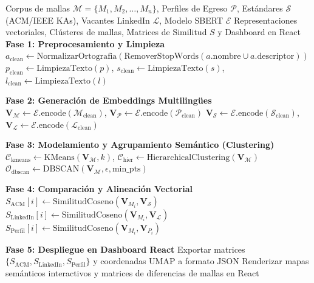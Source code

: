 \begin{algorithm}[H]
	\caption{Pipeline Computacional de Análisis Semántico y Comparación de Mallas Curriculares}
	\label{alg:pipeline_mallas_doc}
	\small
	\begin{algorithmic}[1]
		\Require Corpus de mallas $\mathcal{M} = \{M_1, M_2, \dots, M_n\}$, Perfiles de Egreso $\mathcal{P}$, Estándares $\mathcal{S}$ (ACM/IEEE KAs), Vacantes LinkedIn $\mathcal{L}$, Modelo SBERT $\mathcal{E}$
		\Ensure Representaciones vectoriales, Clústeres de mallas, Matrices de Similitud $S$ y Dashboard en React
		\Statex
			\State \textbf{Fase 1: Preprocesamiento y Limpieza}
				\State $a_{\text{clean}} \leftarrow \text{NormalizarOrtografia}(\text{RemoverStopWords}(a.\text{nombre} \cup a.\text{descriptor}))$
			\EndFor
				\State $p_{\text{clean}} \leftarrow \text{LimpiezaTexto}(p)$, \quad $s_{\text{clean}} \leftarrow \text{LimpiezaTexto}(s)$, \quad $l_{\text{clean}} \leftarrow \text{LimpiezaTexto}(l)$
			\EndFor
			
			\Statex
			\State \textbf{Fase 2: Generación de Embeddings Multilingües}
			\State $\mathbf{V}_{\mathcal{M}} \leftarrow \mathcal{E}.\text{encode}(\mathcal{M}_{\text{clean}})$, \quad $\mathbf{V}_{\mathcal{P}} \leftarrow \mathcal{E}.\text{encode}(\mathcal{P}_{\text{clean}})$
			\State $\mathbf{V}_{\mathcal{S}} \leftarrow \mathcal{E}.\text{encode}(\mathcal{S}_{\text{clean}})$, \quad $\mathbf{V}_{\mathcal{L}} \leftarrow \mathcal{E}.\text{encode}(\mathcal{L}_{\text{clean}})$
			
			\Statex
			\State \textbf{Fase 3: Modelamiento y Agrupamiento Semántico (Clustering)}
			\State $\mathcal{C}_{\text{kmeans}} \leftarrow \text{KMeans}(\mathbf{V}_{\mathcal{M}}, k)$, \quad $\mathcal{C}_{\text{hier}} \leftarrow \text{HierarchicalClustering}(\mathbf{V}_{\mathcal{M}})$
			\State $\mathcal{O}_{\text{dbscan}} \leftarrow \text{DBSCAN}(\mathbf{V}_{\mathcal{M}}, \epsilon, \text{min\_pts})$ 
			
			\Statex
			\State \textbf{Fase 4: Comparación y Alineación Vectorial}
				\State $S_{\text{ACM}}[i] \leftarrow \text{SimilitudCoseno}(\mathbf{V}_{M_i}, \mathbf{V}_{\mathcal{S}})$ 
				\State $S_{\text{LinkedIn}}[i] \leftarrow \text{SimilitudCoseno}(\mathbf{V}_{M_i}, \mathbf{V}_{\mathcal{L}})$ 
				\State $S_{\text{Perfil}}[i] \leftarrow \text{SimilitudCoseno}(\mathbf{V}_{M_i}, \mathbf{V}_{P_i})$ 
			\EndFor
			
			\Statex
			\State \textbf{Fase 5: Despliegue en Dashboard React}
			\State Exportar matrices $\{S_{\text{ACM}}, S_{\text{LinkedIn}}, S_{\text{Perfil}}\}$ y coordenadas UMAP a formato JSON
			\State Renderizar mapas semánticos interactivos y matrices de diferencias de mallas en React
		\EndProcedure
	\end{algorithmic}
\end{algorithm}


